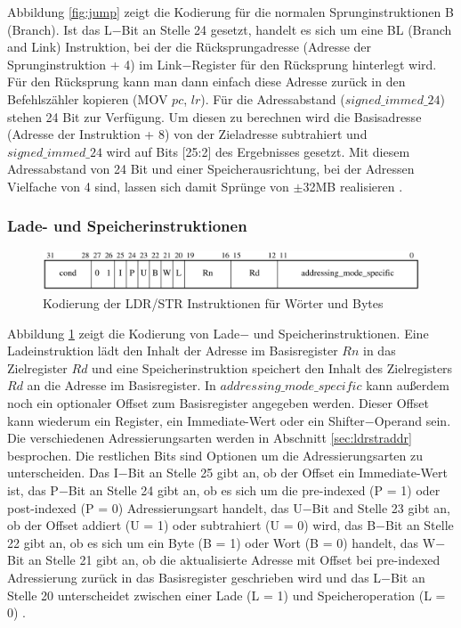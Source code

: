 \documentclass[a4paper, 11pt, onecolumn]{article}
\begin{document}
Abbildung \ref{fig:jump} zeigt die Kodierung für die normalen Sprunginstruktionen B (Branch). Ist das L$-$Bit an Stelle 24 gesetzt, handelt es sich um eine BL (Branch and Link) Instruktion, bei der die Rücksprungadresse (Adresse der Sprunginstruktion + 4) im Link$-$Register für den Rücksprung hinterlegt wird. Für den Rücksprung kann man dann einfach diese Adresse zurück in den Befehlszähler kopieren (MOV $pc$, $lr$). Für die Adressabstand ($signed\_immed\_24$) stehen 24 Bit zur Verfügung. Um diesen zu berechnen wird die Basisadresse (Adresse der Instruktion + 8) von der Zieladresse subtrahiert und $signed\_immed\_24$ wird auf Bits $[$25:2$]$ des Ergebnisses gesetzt. Mit diesem Adressabstand von 24 Bit und einer Speicherausrichtung, bei der Adressen Vielfache von 4 sind, lassen sich damit Sprünge von $\pm$32MB realisieren \cite{arm:2005}.

\subsubsection{Lade- und Speicherinstruktionen}

\begin{figure}[!htb]
\centering
\includegraphics[width=1\textwidth]{data/ldrstr}
\caption{Kodierung der LDR/STR Instruktionen für Wörter und Bytes \cite{arm:2005}}
\label{fig:ldrstr}
\end{figure}

Abbildung \ref{fig:ldrstr} zeigt die Kodierung von Lade$-$ und Speicherinstruktionen. Eine Ladeinstruktion lädt den Inhalt der Adresse im Basisregister $Rn$ in das Zielregister $Rd$ und eine Speicherinstruktion speichert den Inhalt des Zielregisters $Rd$ an die Adresse im Basisregister. In $addressing\_mode\_specific$ kann außerdem noch ein optionaler Offset zum Basisregister angegeben werden. Dieser Offset kann wiederum ein Register, ein Immediate-Wert oder ein Shifter$-$Operand sein. Die verschiedenen Adressierungsarten werden in Abschnitt \ref{sec:ldrstraddr} besprochen. Die restlichen Bits sind Optionen um die Adressierungsarten zu unterscheiden. Das I$-$Bit an Stelle 25 gibt an, ob der Offset ein Immediate-Wert ist, das P$-$Bit an Stelle 24 gibt an, ob es sich um die pre-indexed (P = 1) oder post-indexed (P = 0) Adressierungsart handelt, das U$-$Bit and Stelle 23 gibt an, ob der Offset addiert (U = 1) oder subtrahiert (U = 0) wird, das B$-$Bit an Stelle 22 gibt an, ob es sich um ein Byte (B = 1) oder Wort (B = 0) handelt, das W$-$Bit an Stelle 21 gibt an, ob die aktualisierte Adresse mit Offset bei pre-indexed Adressierung zurück in das Basisregister geschrieben wird und das L$-$Bit an Stelle 20 unterscheidet zwischen einer Lade (L = 1) und Speicheroperation (L = 0) \cite{arm:2005}.
\end{document}

